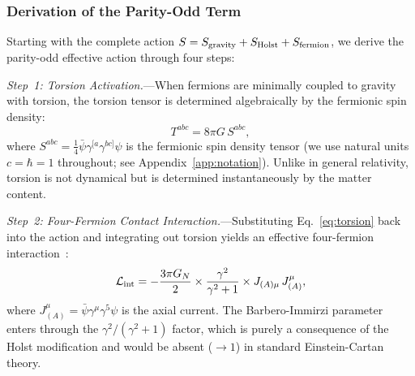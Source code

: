 \documentclass[aps,prd,twocolumn,superscriptaddress,showpacs,preprintnumbers,nofootinbib,longbibliography,floatfix]{revtex4-2}
\begin{document}
\subsubsection{Derivation of the Parity-Odd Term}\label{sec:parityodd}

Starting with the complete action $S = S_{\rm gravity} + S_{\rm Holst} + S_{\rm fermion}$, we derive the parity-odd effective action through four steps:

\textit{Step~1: Torsion Activation.}---When fermions are minimally coupled to gravity with torsion, the torsion tensor is determined algebraically by the fermionic spin density:
\begin{equation}\label{eq:torsion}
T^{abc} = 8\pi G\, S^{abc},
\end{equation}
where $S^{abc} = \frac{1}{4}\bar{\psi}\gamma^{[a}\gamma^{bc]}\psi$ is the fermionic spin density tensor (we use natural units $c=\hbar=1$ throughout; see Appendix~\ref{app:notation}). Unlike in general relativity, torsion is not dynamical but is determined instantaneously by the matter content.

\textit{Step~2: Four-Fermion Contact Interaction.}---Substituting Eq.~\eqref{eq:torsion} back into the action and integrating out torsion yields an effective four-fermion interaction~\cite{Hehl1976}:
\begin{equation}\label{eq:4fermi}
\mathcal{L}_{\rm int} = -\frac{3\pi G_N}{2}\times \frac{\gamma^2}{\gamma^2+1}\times J_{(A)\mu}\,J^{\mu}_{(A)},
\end{equation}
where $J^{\mu}_{(A)}=\bar{\psi}\gamma^{\mu}\gamma^5\psi$ is the axial current. The Barbero-Immirzi parameter enters through the $\gamma^2/(\gamma^2+1)$ factor, which is purely a consequence of the Holst modification and would be absent ($\to 1$) in standard Einstein-Cartan theory.
\end{document}
